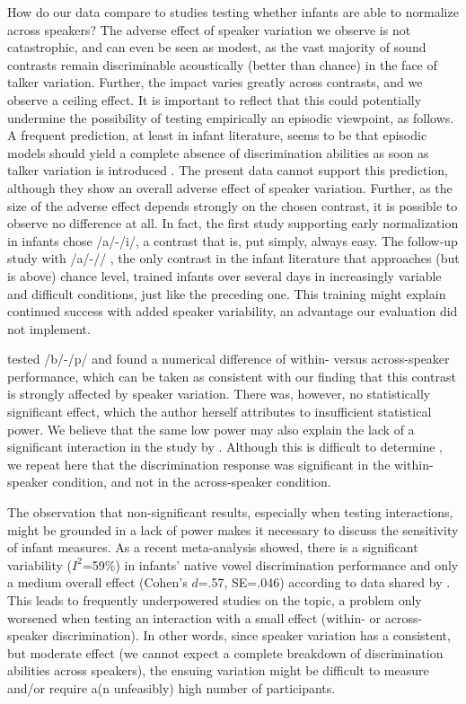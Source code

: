\documentclass[10pt,letterpaper]{article}
\begin{document}
How do our data compare to studies testing whether infants are able to normalize across speakers? The adverse effect of speaker variation we observe is not catastrophic, and can even be seen as modest, as the vast majority of sound contrasts remain discriminable acoustically (better than chance) in the face of talker variation. Further, the impact varies greatly across contrasts, and we observe a ceiling effect. It is important to reflect that this could potentially undermine the possibility of testing empirically an episodic viewpoint, as follows. A frequent prediction, at least in infant literature, seems to be that episodic models should yield a complete absence of discrimination abilities as soon as talker variation is introduced \cite{DehaeneLambertzPena}. The present data cannot support this prediction, although they show an overall adverse effect of speaker variation. Further, as the size of the adverse effect depends strongly on the chosen contrast, it is possible to observe no difference at all. In fact, the first study supporting early normalization in infants \cite{Kuhl1979} chose /a/-/i/, a contrast that is, put simply, always easy. The follow-up study with /a/-/\textopeno/ \cite{Kuhl1983}, the only contrast in the infant literature that approaches (but is above) chance level, trained infants over several days in increasingly variable and difficult conditions, just like the preceding one. This training might explain continued success with added speaker variability, an advantage our evaluation did not implement. 

 tested /b/-/p/ and found a numerical difference of within- versus across-speaker performance, which can be taken as consistent with our finding that this contrast is strongly affected by speaker variation. There was, however, no statistically significant effect, which the author herself attributes to insufficient statistical power. We believe that the same low power may also explain the lack of a significant interaction in the study by . Although this is difficult to determine \cite{gelman2006difference}, we repeat here that the discrimination response was significant in the within-speaker condition, and not in the across-speaker condition. 

The observation that non-significant results, especially when testing interactions, might be grounded in a lack of power makes it necessary to discuss the sensitivity of infant measures. As a recent meta-analysis showed, there is a significant variability ($I^2$=59\%) in infants' native vowel discrimination performance and only a medium overall effect (Cohen's $d$=.57, SE=.046) according to data shared by . This leads to frequently underpowered studies on the topic, a problem only worsened when testing an interaction with a small effect (within- or across-speaker discrimination).
In other words, since speaker variation has a consistent, but moderate effect (we cannot expect a complete breakdown of discrimination abilities across speakers), the ensuing variation might be difficult to measure and/or require a(n unfeasibly) high number of participants. 
  
\end{document}
